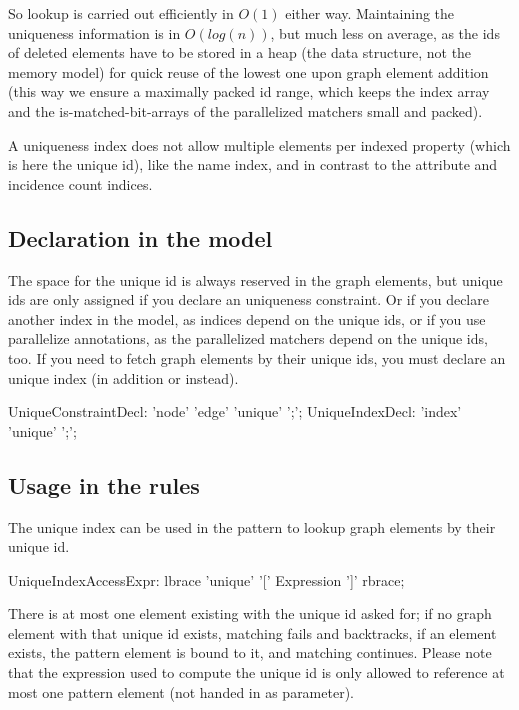 So lookup is carried out efficiently in $O(1)$ either way.
Maintaining the uniqueness information is in $O(log(n))$, but much less on average, as the ids of deleted elements have to be stored in a heap (the data structure, not the memory model) for quick reuse of the lowest one upon graph element addition (this way we ensure a maximally packed id range, which keeps the index array and the is-matched-bit-arrays of the parallelized matchers small and packed).

A uniqueness index does not allow multiple elements per indexed property (which is here the unique id), like the name index, and in contrast to the attribute and incidence count indices.

\subsection*{Declaration in the model}
The space for the unique id is always reserved in the graph elements, but unique ids are only assigned if you declare an uniqueness constraint.
Or if you declare another index in the model, as indices depend on the unique ids, or if you use parallelize annotations, as the parallelized matchers depend on the unique ids, too.
If you need to fetch graph elements by their unique ids, you must declare an unique index (in addition or instead).

\begin{rail}
  UniqueConstraintDecl: 'node' 'edge' 'unique' ';';
  UniqueIndexDecl: 'index' 'unique' ';';
\end{rail}


\subsection*{Usage in the rules}
The unique index can be used in the pattern to lookup graph elements by their unique id.

\begin{rail}
  UniqueIndexAccessExpr:
    lbrace 'unique' '[' Expression ']' rbrace;
\end{rail}

There is at most one element existing with the unique id asked for; if no graph element with that unique id exists, matching fails and backtracks, if an element exists, the pattern element is bound to it, and matching continues.
Please note that the expression used to compute the unique id is only allowed to reference at most one pattern element (not handed in as parameter).

